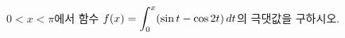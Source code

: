 \hspace*{2mm}\begin{minipage}[t]{\dimexpr\linewidth-2mm\relax}\vspace{0pt}
$0<x<\pi$에서 함수 $f(x)=\displaystyle\int_{0}^{x}(\sin t-\cos 2t)\mkern3mu dt$의 극댓값을 구하시오.\end{minipage}
